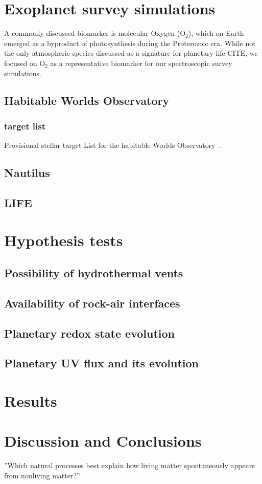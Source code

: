 \documentclass[twocolumn]{aastex631}
\begin{document}
\section{Exoplanet survey simulations}
A commonly discussed biomarker is molecular Oxygen (O$_2$), which on Earth emerged as a byproduct of photosynthesis during the Proterozoic era.
While not the only atmospheric species discussed as a signature for planetary life CITE, we focused on O$_2$ as a representative biomarker for our spectroscopic survey simulations.


\subsection{Habitable Worlds Observatory}
\subsubsection{target list}
Provisional stellar target List for the habitable Worlds Observatory~\citep{Mamajek2023}.

\subsection{Nautilus}
\subsection{LIFE} %

\section{Hypothesis tests}
\label{sec:hypotests}
\subsection{Possibility of hydrothermal vents}

\subsection{Availability of rock-air interfaces}

\subsection{Planetary redox state evolution}

\subsection{Planetary UV flux and its evolution}


\section{Results}
\label{sec:results}

\section{Discussion and Conclusions}
\label{sec:discussion}

''Which natural processes best explain how living matter spontaneously appears from nonliving matter?''~\citep{Malaterre2022}


\end{document}
